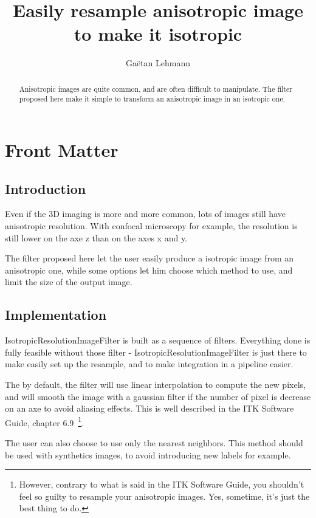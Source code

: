 \documentclass{InsightArticle}
\title{Easily resample anisotropic image to make it isotropic}
\author{Ga\"etan Lehmann}
\begin{document}
\maketitle

\ifhtml
\chapter*{Front Matter\label{front}}
\fi


\begin{abstract}
\noindent
Anisotropic images are quite common, and are often difficult to manipulate. The filter proposed here make it simple to transform an anisotropic image in an isotropic one.
\end{abstract}


\section{Introduction}

Even if the 3D imaging is more and more common, lots of images still have anisotropic resolution. With confocal microscopy for example, the resolution is still lower on the axe z than on the axes x and y.

The filter proposed here let the user easily produce a isotropic image from an anisotropic one, while some options let him choose which method to use, and limit the size of the output image.

\section{Implementation}

IsotropicResolutionImageFilter is built as a sequence of filters. Everything done is fully feasible without those filter - IsotropicResolutionImageFilter is just there to make easily set up the resample, and to make integration in a pipeline easier.

The by default, the filter will use linear interpolation to compute the new pixels, and will smooth the image with a gaussian filter if the number of pixel is decrease on an axe to avoid aliasing effects. This is well described in the ITK Software Guide, chapter 6.9\cite{ITKSoftwareGuide}~\footnote{However, contrary to what is said in the ITK Software Guide, you shouldn't feel so guilty to resample your anisotropic images. Yes, sometime, it's just the best thing to do.}.

The user can also choose to use only the nearest neighbors. This method should be used with synthetics images, to avoid introducing new labels for example.
\end{document}
